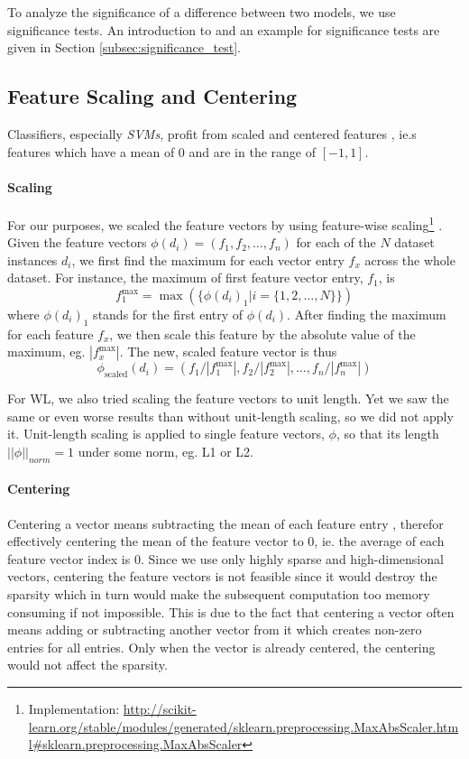 To analyze the significance of a difference between two models, we use significance tests.
An introduction to and an example for significance tests are given in Section \ref{subsec:significance_test}.

\subsection{Feature Scaling and Centering}
Classifiers, especially \textit{SVMs}, profit from scaled and centered features \cite{Graf2001}, ie.s features which have a mean of 0 and are in the range of $[-1, 1]$.

\paragraph{Scaling}
For our purposes, we scaled the feature vectors by using feature-wise scaling\footnote{Implementation: \url{http://scikit-learn.org/stable/modules/generated/sklearn.preprocessing.MaxAbsScaler.html\#sklearn.preprocessing.MaxAbsScaler}} \cite[p.~567]{Bishop2006}.
Given the feature vectors $\phi(d_i) = (f_1, f_2, \ldots, f_n)$ for each of the $N$ dataset instances $d_i$, we first find the maximum for each vector entry $f_x$ across the whole dataset. For instance, the maximum of first feature vector entry, $f_1$, is
\begin{equation*}
f_1^{\textrm{max}} = \max(\{\phi(d_i)_{1} | i = \{1, 2, \ldots, N\} \})
\end{equation*}
where $\phi(d_i)_{1}$ stands for the first entry of $\phi(d_i)$.
After finding the maximum for each feature $f_x$, we then scale this feature by the absolute value of the maximum, eg. $|f_x^{\textrm{max}}|$.
The new, scaled feature vector is thus
\begin{equation*}
\phi_{\textrm{scaled}}(d_i) = (f_1 / |f_1^{\textrm{max}}|, f_2 / |f_2^{\textrm{max}}|, \ldots, f_n / |f_n^{\textrm{max}}|)
\end{equation*}

For WL, we also tried scaling the feature vectors to unit length. Yet we saw the same or even worse results than without unit-length scaling, so we did not apply it.
Unit-length scaling is applied to single feature vectors, $\phi$, so that its length $||\phi||_{norm} = 1$ under some norm, eg. L1 or L2.

\paragraph{Centering}
Centering a vector means subtracting the mean of each feature entry  \cite[p.~567]{Bishop2006}, therefor effectively centering the mean of the feature vector to 0, ie. the average of each feature vector index is 0.
Since we use only highly sparse and high-dimensional vectors, centering the feature vectors is not feasible since it would destroy the sparsity which in turn would make the subsequent computation too memory consuming if not impossible.
This is due to the fact that centering a vector often means adding or subtracting another vector from it which creates non-zero entries for all entries.
Only when the vector is already centered, the centering would not affect the sparsity.

